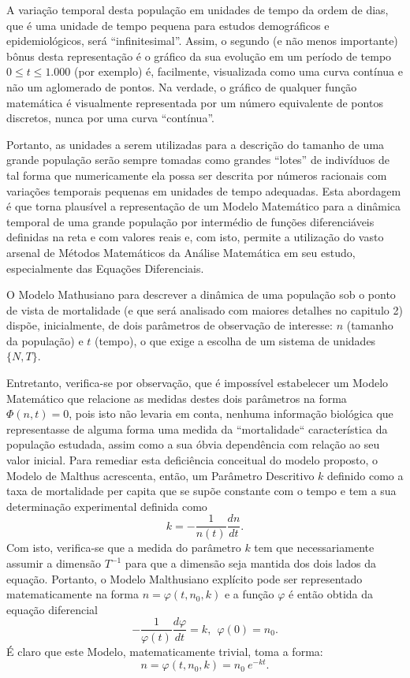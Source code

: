     A variação temporal desta população em unidades de tempo da ordem de dias, que é uma unidade de tempo pequena para estudos demográficos e epidemiológicos, será ``infinitesimal''. Assim, o segundo (e não menos importante) bônus desta representação é o gráfico da sua evolução em um período de tempo \(0 \le t \le 1.000\) (por exemplo) é, facilmente, visualizada como uma curva contínua e não um aglomerado de pontos. Na verdade, o gráfico de qualquer função matemática é visualmente representada por um número equivalente de pontos discretos, nunca por uma curva ``contínua''.

    Portanto, as unidades a serem utilizadas para a descrição do tamanho de uma grande população serão sempre tomadas como grandes ``lotes'' de indivíduos de tal forma que numericamente ela possa ser descrita por números racionais com variações temporais pequenas em unidades de tempo adequadas. Esta abordagem é que torna plausível a representação de um Modelo Matemático para a dinâmica temporal de uma grande população por intermédio de funções diferenciáveis definidas na reta e com valores reais e, com isto, permite a utilização do vasto arsenal de Métodos Matemáticos da Análise Matemática em seu estudo, especialmente das Equações Diferenciais.

    O Modelo Mathusiano para descrever a dinâmica de uma população sob o ponto de vista de mortalidade (e que será analisado com maiores detalhes no capitulo 2) dispõe, inicialmente, de dois parâmetros de observação de interesse: \(n\) (tamanho da população) e \(t\) (tempo), o que exige a escolha de um sistema de unidades \(\{N,T\}\).

    Entretanto, verifica-se por observação, que é impossível estabelecer um Modelo Matemático que relacione as medidas destes dois parâmetros na forma \(\Phi(n,t) = 0\), pois isto não levaria em conta, nenhuma informação biológica que representasse de alguma forma uma medida da ``mortalidade`` característica da população estudada, assim como a sua óbvia dependência com relação ao seu valor inicial. Para remediar esta deficiência conceitual do modelo proposto, o Modelo de Malthus acrescenta, então, um Parâmetro Descritivo \(k\) definido como a taxa de mortalidade per capita que se supõe constante com o tempo e tem a sua determinação experimental definida como
    \[k = -\dfrac{1}{n(t)} \dfrac{dn}{dt}.\]
    Com isto, verifica-se que a medida do parâmetro \(k\) tem que necessariamente assumir a dimensão \(T^{-1}\) para que a dimensão seja mantida dos dois lados da equação. Portanto, o Modelo Malthusiano explícito pode ser representado matematicamente na forma \(n = \varphi(t, n_0, k)\) e a função \(\varphi\) é então obtida da equação diferencial
    {\red \[-\dfrac{1}{\varphi(t)} \dfrac{d\varphi}{dt} = k,\ \ \varphi(0) = n_0.\]}
    É claro que este Modelo, matematicamente trivial, toma a forma:
    \[n = \varphi(t, n_{0}, k) = n_{0}\ e^{-k t}.\]

